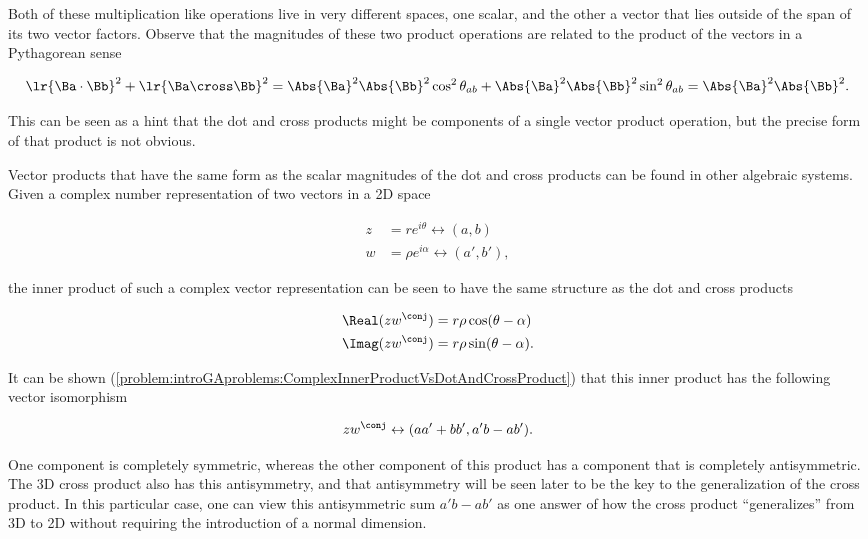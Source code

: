 Both of these multiplication like operations live in very different spaces, one scalar, and the other a vector that lies outside of the span of its two vector factors.  Observe that the magnitudes of these two product operations are related to the product of the vectors in a Pythagorean sense

\begin{dmath}\label{eqn:GAmotivation:180}
\lr{ \Ba \cdot \Bb }^2 + \lr{ \Ba \cross \Bb }^2 
=
\Abs{\Ba}^2 \Abs{\Bb}^2 \cos^2 \theta_{ab} 
+\Abs{\Ba}^2 \Abs{\Bb}^2 \sin^2 \theta_{ab} 
= 
\Abs{\Ba}^2 \Abs{\Bb}^2.
\end{dmath}

This can be seen as a hint that the dot and cross products might be components of a single vector product operation, but the precise form of that product is not obvious.

Vector products that have the same form as the scalar magnitudes of the dot and cross products can be found in other algebraic systems.  Given a complex number representation of two vectors in a 2D space

\begin{dmath}\label{eqn:GAmotivation:200}
\begin{aligned}
z &= r e^{i \theta} \leftrightarrow (a, b) \\
w &= \rho e^{i \alpha} \leftrightarrow (a', b'),
\end{aligned}
\end{dmath}

the inner product of such a complex vector representation can be seen to have the same structure as the dot and cross products

\begin{equation}\label{eqn:GAmotivation:100}
\begin{aligned}
\Real( z w^\conj ) &= r \rho \cos(\theta - \alpha) \\
\Imag( z w^\conj ) &= r \rho \sin(\theta - \alpha).
\end{aligned}
\end{equation}

It can be shown 
(\cref{problem:introGAproblems:ComplexInnerProductVsDotAndCrossProduct}) 
that this inner product has the following vector isomorphism

\begin{dmath}\label{eqn:GAmotivation:220}
z w^\conj \leftrightarrow ( a a' + b b', a' b - a b' ).
\end{dmath}

One component is completely symmetric, whereas the other component of this product has a component that is completely antisymmetric.  
The 3D cross product also has this antisymmetry, and that antisymmetry will be seen later to be the key to the generalization of the cross product.  In this particular case, one can view this antisymmetric sum \( a' b - a b' \) as one 
answer of how the cross product ``generalizes'' from 3D to 2D without requiring the introduction of a normal dimension.

